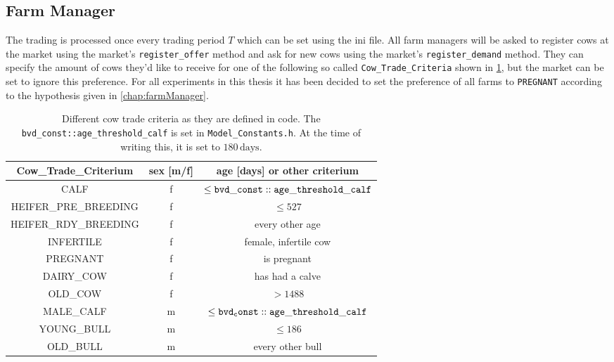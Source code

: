 \subsection{Farm Manager}
The trading is processed once every trading period $T$ which can be set using the ini file. All farm managers will be asked to register cows at the market using the market's {\tt register\_offer} method and ask for new cows using the market's {\tt register\_demand} method. They can specify the amount of cows they'd like to receive for one of the following so called {\tt Cow\_Trade\_Criteria} shown in \ref{tab:cowTradeCrit}, but the market can be set to ignore this preference. 
For all experiments in this thesis it has been decided to set the preference of all farms to {\tt PREGNANT} according to the hypothesis given in \ref{chap:farmManager}. 

\begin{table}[htb]%

    \begin{center}
    \begin{tabular}{|ccc|}\hline
        \rowcolor{dunkelgrau} Cow\_Trade\_Criterium  & sex [m/f] & age [days] or other criterium \\\hline
                              CALF  & f& $\leq {\tt bvd\_const::age\_threshold\_calf}$\\\hline
\rowcolor{hellgrau}           HEIFER\_PRE\_BREEDING  & f& $\leq 527$\footnotemark \\\hline
                              HEIFER\_RDY\_BREEDING  & f& every other age \\\hline
\rowcolor{hellgrau}           INFERTILE  & f& female, infertile cow \\\hline
                              PREGNANT  & f& is pregnant\\\hline
\rowcolor{hellgrau}           DAIRY\_COW  & f& has had a calve\\\hline 
                              OLD\_COW & f& $> 1488 $\\ \hline
\rowcolor{hellgrau}            MALE\_CALF &   m & $\leq {\tt bvd_const::age\_threshold\_calf}$   \\\hline
                               YOUNG\_BULL & m  &  $\leq 186$  \\\hline 
\rowcolor{hellgrau}           OLD\_BULL   &  m  & every other bull   \\\hline           
\end{tabular}

\caption[Explanation of Cow Trade Criteria]{Different cow trade criteria as they are defined in code. The {\tt bvd\_const::age\_threshold\_calf} is set in {\tt Model\_Constants.h}. At the time of writing this, it is set to $ 180 \, \text{days} $.}
\label{tab:cowTradeCrit} 
\end{center}
\end{table}

